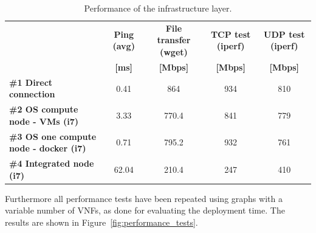 \begin{table}[!htbp]
	\centering
	\tiny
	\caption{Performance of the infrastructure layer.}
	\label{tab:evaluation}
	\begin{tabular}{l||c|c|c|c||}
		& \textbf{Ping (avg) } & \textbf{File transfer (wget) }& \textbf{TCP test (iperf)}  & \textbf{UDP test (iperf)}\\ & \textbf{[ms]} & \textbf{[Mbps]} & \textbf{[Mbps]} & \textbf{[Mbps]}\\
		
		\hline	
		\hline
		\textbf{\#1 Direct connection} & 0.41  & 864  & 934  & 810 \\
		\hline
		\textbf{\#2 OS compute node - VMs (i7)} & 3.33  & 770.4 & 841 & 779 \\
		\hline
		\textbf{\#3 OS one compute node - docker (i7)} & 0.71 & 795.2  & 932 & 761   \\
		\hline
		\textbf{\#4 Integrated node (i7)} & 62.04 & 210.4 & 247  & 410\\
		\hline
	\end{tabular}
\end{table} 

Furthermore all performance tests have been repeated using graphs with a variable number of VNFs, as done for evaluating the deployment time. The results are shown in Figure~\ref{fig:performance_tests}.

